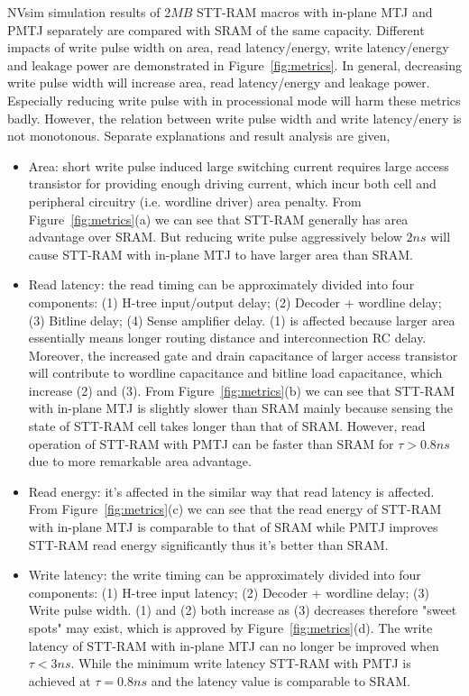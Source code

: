 NVsim simulation results of 2$MB$ STT-RAM macros with in-plane MTJ and PMTJ separately are compared with SRAM of the same capacity. Different impacts of write pulse width on area, read latency/energy, write latency/energy and leakage power are demonstrated in Figure~\ref{fig:metrics}. In general, decreasing write pulse width will increase area, read latency/energy and leakage power. Especially reducing write pulse with in processional mode will harm these metrics badly. However, the relation between write pulse width and write latency/enery is not monotonous. Separate explanations and result analysis are given,
\begin{itemize}
\item Area: short write pulse induced large switching current requires large access transistor for providing enough driving current, which incur both cell and peripheral circuitry (i.e. wordline driver) area penalty. From Figure~\ref{fig:metrics}(a) we can see that STT-RAM generally has area advantage over SRAM. But reducing write pulse aggressively below $2ns$ will cause STT-RAM with in-plane MTJ to have larger area than SRAM.
\item Read latency: the read timing can be approximately divided into four components: (1) H-tree input/output delay; (2) Decoder + wordline delay; (3) Bitline delay; (4) Sense amplifier delay. (1) is affected because larger area essentially means longer routing distance and interconnection RC delay. Moreover, the increased gate and drain capacitance of larger access transistor will contribute to wordline capacitance and bitline load capacitance, which increase (2) and (3). From Figure~\ref{fig:metrics}(b) we can see that STT-RAM with in-plane MTJ is slightly slower than SRAM mainly because sensing the state of STT-RAM cell takes longer than that of SRAM. However, read operation of STT-RAM with PMTJ can be faster than SRAM for $\tau > 0.8ns$ due to more remarkable area advantage. 
\item Read energy: it's affected in the similar way that read latency is affected. From Figure~\ref{fig:metrics}(c) we can see that the read energy of STT-RAM with in-plane MTJ is comparable to that of SRAM while PMTJ improves STT-RAM read energy significantly thus it's better than SRAM.
\item Write latency: the write timing can be approximately divided into four components: (1) H-tree input latency; (2) Decoder + wordline delay; (3) Write pulse width. (1) and (2) both increase as (3) decreases therefore "sweet spots" may exist, which is approved by Figure~\ref{fig:metrics}(d). The write latency of STT-RAM with in-plane MTJ can no longer be improved when $\tau < 3ns$. While the minimum write latency STT-RAM with PMTJ is achieved at $\tau = 0.8ns$ and the latency value is comparable to SRAM.

\end{itemize}
